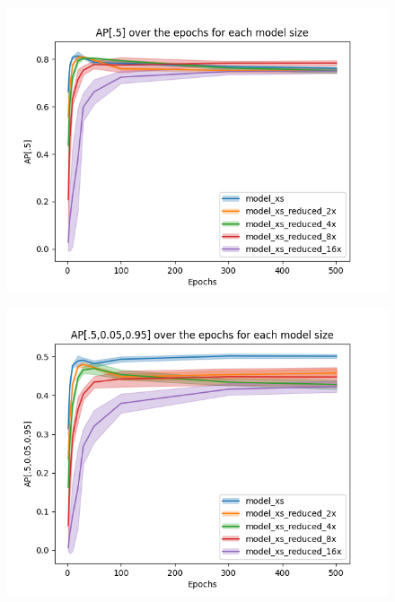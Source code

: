 \begin{figure}[!htbp]
    \centering
    \begin{minipage}[t]{.5\textwidth}%
      \centering
      \includegraphics[width=1.1\linewidth]{Figures/results/yolov8/ap05_over_epochs_reduced_models.png}
      \label{fig:yolov8_visulization_ap05_reduced_models}
    \end{minipage}%
    \begin{minipage}[t]{.5\textwidth}%
      \centering
      \includegraphics[width=1.1\linewidth ]{Figures/results/yolov8/ap05_095_over_epochs_reduced_models.png}
      \label{fig:yolov8_visulization_ap05_095_reduced_models}
    \end{minipage}
\end{figure}

